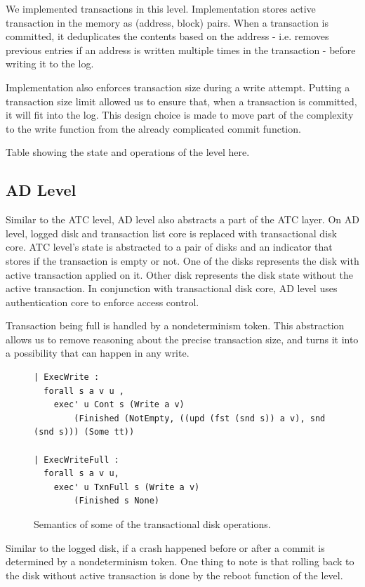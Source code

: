 We implemented transactions in this level. Implementation stores active transaction in the memory as (address, block) pairs. When a transaction is committed, it deduplicates the contents based on the address - i.e. removes previous entries if an address is written multiple times in the transaction - before writing it to the log.

Implementation also enforces transaction size during a write attempt. Putting a transaction size limit allowed us to ensure that, when a transaction is committed, it will fit into the log. This design choice is made to move part of the complexity to the write function from the already complicated commit function.

{\color{red} Table showing the state and operations of the level here}.

\subsection{AD Level}
Similar to the ATC level, AD level also abstracts a part of the ATC layer. On AD level, logged disk and transaction list core is replaced with transactional disk core. ATC level's state is abstracted to a pair of disks and an indicator that stores if the transaction is empty or not. One of the disks represents the disk with active transaction applied on it. Other disk represents the disk state without the active transaction. In conjunction with transactional disk core, AD level uses authentication core to enforce access control.

Transaction being full is handled by a nondeterminism token. This abstraction allows us to remove reasoning about the precise transaction size, and turns it into a possibility that can happen in any write.

\begin{figure}[ht]
    \centering
\begin{verbatim}
| ExecWrite :
  forall s a v u ,
    exec' u Cont s (Write a v) 
        (Finished (NotEmpty, ((upd (fst (snd s)) a v), snd (snd s))) (Some tt))

| ExecWriteFull :
  forall s a v u,
    exec' u TxnFull s (Write a v) 
        (Finished s None)
\end{verbatim}
    \caption{Semantics of some of the transactional disk operations.}
    \label{fig:TD_Semantics}
\end{figure}

Similar to the logged disk, if a crash happened before or after a commit is determined by a nondeterminism token. One thing to note is that rolling back to the disk without active transaction is done by the reboot function of the level.

